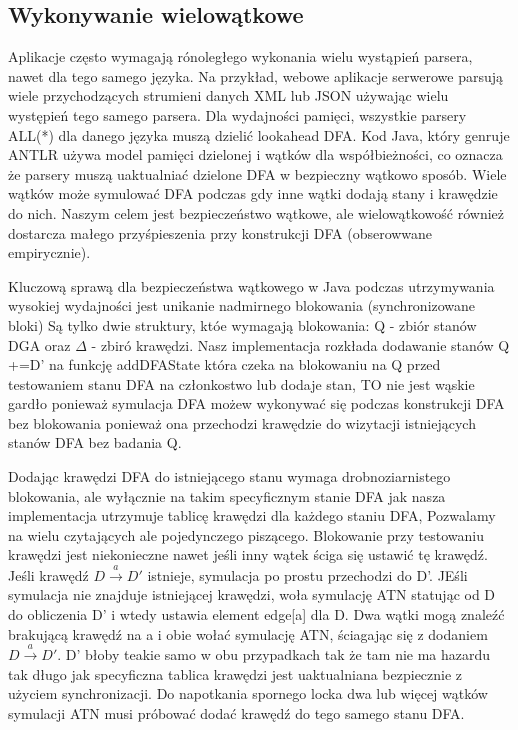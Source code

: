 \subsection{Wykonywanie wielowątkowe}
Aplikacje często wymagają rónoległego wykonania wielu wystąpień
parsera, nawet dla tego samego języka. Na przykład, webowe
aplikacje serwerowe parsują wiele przychodzących strumieni danych
XML lub JSON używając wielu występień tego samego parsera. Dla
wydajności pamięci, wszystkie parsery ALL(*) dla danego języka
muszą dzielić lookahead DFA. Kod Java, który genruje
ANTLR używa model pamięci dzielonej i wątków dla współbieżności,
co oznacza że parsery muszą uaktualniać dzielone DFA
w bezpieczny wątkowo sposób. Wiele wątków może symulować DFA
podczas gdy inne wątki dodają stany i krawędzie do nich.
Naszym celem jest bezpieczeństwo wątkowe, ale wielowątkowość
również dostarcza małego przyśpieszenia przy konstrukcji DFA
(obserowwane empirycznie).
\par
Kluczową sprawą  dla bezpieczeństwa wątkowego w Java podczas
utrzymywania wysokiej wydajności jest unikanie nadmirnego blokowania
(synchronizowane bloki) Są tylko dwie struktury, któe wymagają blokowania:
Q - zbiór stanów DGA oraz $\Delta$ - zbiró krawędzi. Nasz implementacja
rozkłada dodawanie stanów Q +=D' na funkcję addDFAState
która czeka na blokowaniu na Q przed testowaniem stanu DFA
na członkostwo lub dodaje stan, TO nie jest wąskie gardło
ponieważ symulacja DFA możew wykonywać się podczas
konstrukcji DFA bez blokowania ponieważ ona przechodzi
krawędzie do wizytacji istniejących stanów DFA bez badania Q.
\par
Dodając krawędzi DFA do istniejącego stanu wymaga drobnoziarnistego
blokowania, ale wyłącznie na takim specyficznym stanie DFA
jak nasza implementacja utrzymuje tablicę krawędzi dla każdego
staniu DFA, Pozwalamy na wielu czytających ale pojedynczego piszącego.
Blokowanie przy testowaniu krawędzi jest niekonieczne nawet
jeśli inny wątek ściga się ustawić tę krawędź.
Jeśli krawędź $D\overset{a}{\rightarrow}D'$ istnieje, symulacja
po prostu przechodzi do D'. JEśli symulacja nie znajduje istniejącej
krawędzi, woła symulację ATN statując od D do obliczenia D' i wtedy
ustawia element edge[a] dla D. Dwa wątki mogą znaleźć brakującą
krawędź na a i obie wołać symulację ATN, ściagając się z dodaniem
$D\overset{a}{\rightarrow}D'$.
D' błoby teakie samo w obu przypadkach tak że tam nie ma hazardu
tak długo jak specyficzna tablica krawędzi jest uaktualniana
bezpiecznie z użyciem synchronizacji.
Do napotkania spornego locka dwa lub więcej wątków symulacji ATN
musi próbować dodać krawędź do tego samego stanu DFA.
